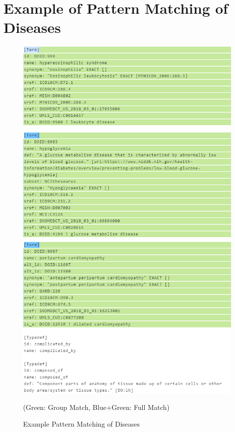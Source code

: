 \chapter{Example of Pattern Matching of Diseases}
\label{Anhang_PatterMatching}
\begin{figure}[H]
\centering
\includegraphics[scale=0.68]{bilder/regex_match1.png}
\includegraphics[scale=0.68]{bilder/regex_match2.png}
\caption{Example Pattern Matching of Diseases}
(Green: Group Match, Blue+Green: Full Match)
\end{figure}

